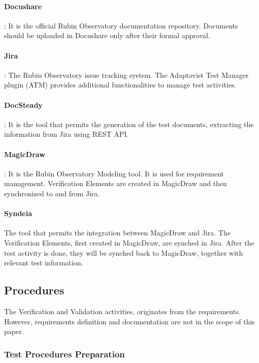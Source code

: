 \paragraph{Docushare}:
It is the official Rubin Observatory documentation repository.
Documents should be uploaded in Docushare only after their formal approval.

\paragraph{Jira}:
The Rubin Observatory issue tracking system.
The Adaptavist Test Manager plugin (ATM) provides additional functionalities to manage test activities.

\paragraph{DocSteady}:
It is the tool that permits the generation of the test documents, extracting the information from Jira using REST API.

\paragraph{MagicDraw}:
It is the Rubin Observatory Modeling tool. It is used for requirement management. Verification Elements are created
in MagicDraw and then synchronized to and from Jira.

\paragraph{Syndeia}
The tool that permits the integration between MagicDraw and Jira. The Verification Elements, first created in MagicDraw,
are synched in Jira. After the test activity is done, they will be synched back to MagicDraw, together with relevant test information.


\subsection{Procedures}

The Verification and Validation activities, originates from the requirements.
However, requirements definition and documentation are not in the scope of this paper.

\subsubsection{Test Procedures Preparation}


